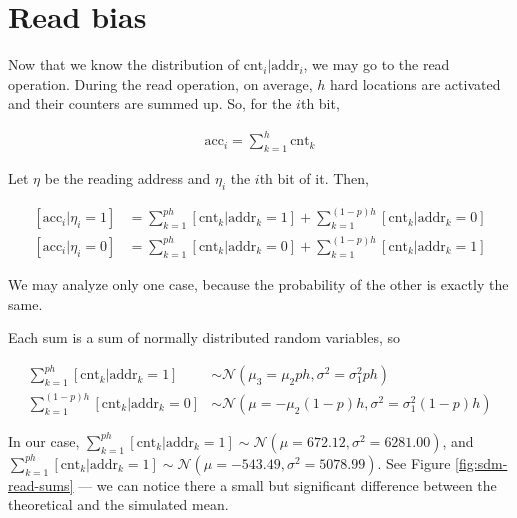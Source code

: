 \documentclass[12pt]{article}
\begin{document}
\section{Read bias}

Now that we know the distribution of $\text{cnt}_i | \text{addr}_i$, we may go to the read operation. During the read operation, on average, $h$ hard locations are activated and their counters are summed up. So, for the $i$th bit,

\begin{align}
\text{acc}_i = \sum_{k=1}^{h} \text{cnt}_k
\end{align}

Let $\eta$ be the reading address and $\eta_i$ the $i$th bit of it. Then,

\begin{align}
\left[ \text{acc}_i|\eta_i=1 \right] &= \sum_{k=1}^{ph} \left[ \text{cnt}_k | \text{addr}_k=1 \right] + \sum_{k=1}^{(1-p)h} \left[ \text{cnt}_k | \text{addr}_k=0 \right] \\
\left[ \text{acc}_i|\eta_i=0 \right] &= \sum_{k=1}^{ph} \left[ \text{cnt}_k | \text{addr}_k=0 \right] + \sum_{k=1}^{(1-p)h} \left[ \text{cnt}_k | \text{addr}_k=1 \right]
\end{align}

We may analyze only one case, because the probability of the other is exactly the same.

Each sum is a sum of normally distributed random variables, so

\begin{align}
\sum_{k=1}^{ph} \left[ \text{cnt}_k | \text{addr}_k=1 \right] &\sim \mathcal{N}(\mu_3 = \mu_2 ph, \sigma^2 = \sigma_1^2 ph) \label{eqn:sdm-eta1-addr1} \\
\sum_{k=1}^{(1-p)h} \left[ \text{cnt}_k | \text{addr}_k=0 \right] &\sim \mathcal{N}(\mu = -\mu_2 (1-p)h, \sigma^2 = \sigma_1^2 (1-p)h) \label{eqn:sdm-eta1-addr0}
\end{align}

In our case, $\sum_{k=1}^{ph} \left[ \text{cnt}_k | \text{addr}_k=1 \right] \sim \mathcal{N}(\mu=672.12, \sigma^2=6281.00)$, and $\sum_{k=1}^{ph} \left[ \text{cnt}_k | \text{addr}_k=1 \right] \sim \mathcal{N}(\mu=-543.49, \sigma^2=5078.99)$. See Figure \ref{fig:sdm-read-sums} --- we can notice there a small but significant difference between the theoretical and the simulated mean.
\end{document}
